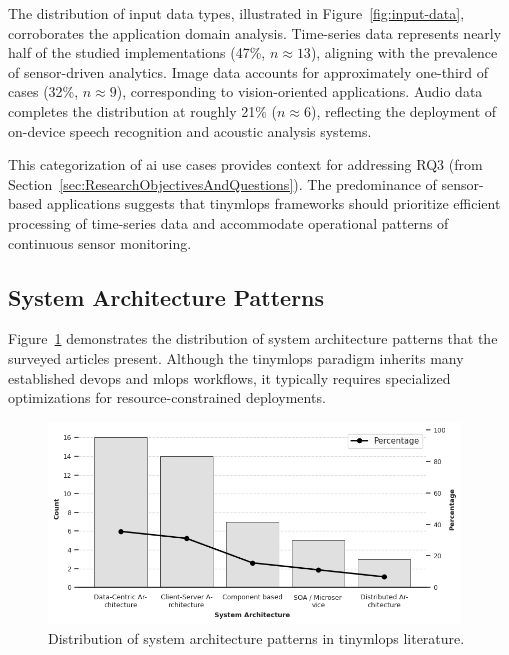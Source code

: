 The distribution of input data types, illustrated in Figure~\ref{fig:input-data}, corroborates the application domain analysis. Time-series data represents nearly half of the studied implementations (47\%, $n \approx 13$), aligning with the prevalence of sensor-driven analytics. Image data accounts for approximately one-third of cases (32\%, $n \approx 9$), corresponding to vision-oriented applications. Audio data completes the distribution at roughly 21\% ($n \approx 6$), reflecting the deployment of on-device speech recognition and acoustic analysis systems.

This categorization of \gls{ai} use cases provides context for addressing RQ3 (from Section~\ref{sec:ResearchObjectivesAndQuestions}). The predominance of sensor-based applications suggests that \gls{tinymlops} frameworks should prioritize efficient processing of time-series data and accommodate operational patterns of continuous sensor monitoring.

\subsection{System Architecture Patterns}
\label{ssec:SystemArchitectureResults}

Figure~\ref{fig:sysAarch} demonstrates the distribution of system architecture patterns that the surveyed articles present. Although the \gls{tinymlops} paradigm inherits many established \gls{devops} and \gls{mlops} workflows, it typically requires specialized optimizations for resource-constrained deployments.

\begin{figure}[htbp]
    \centering
    \includegraphics[width=0.975\textwidth]{figs/research_results/sms-system-architecture.png}
    \caption[Distribution of system architecture patterns]{Distribution of system architecture patterns in \gls{tinymlops} literature.}
    \label{fig:sysAarch}
\end{figure}

